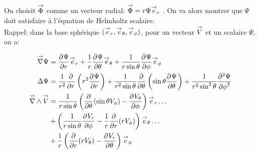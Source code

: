 On choisit \(\vect \Phi\) comme un vecteur radial: \(\vect \Phi = r \Psi \vect e_r\) \cite[p.~84]{bohren_absorption_2004}. On va alors montrer que \(\Psi\) doit satisfaire à l'équation de Helmholtz scalaire.\\

Rappel: dans la base sphérique \((\vect e_r, \vect e_\theta, \vect e_\phi)\), pour
un vecteur \(\vect V\)
et un scalaire \(\Psi\), on a:

\begin{align*}
\vgrad \Psi &= \ddr{r}{\Psi} \vect e_r + \frac{1}{r}\ddr{\theta}{\Psi}\vect e_\theta + \frac{1}{r\sin\theta}\ddr{\phi}{\Psi} \vect e_\phi\\
 \Delta \Psi & = \frac{1}{r^2}\ddr{r}{}\left(r^2\ddr{r}{\Psi}\right)
+ \frac{1}{r^2\sin\theta}\ddr{\theta}{}\left(\sin\theta\ddr{\theta}{\Psi}\right)
+ \frac{1}{r^2\sin^2\theta}\ddr[2]{\phi}{\Psi} \\
\vrot \vect V &= \frac{1}{r\sin\theta}\left(\ddr{\theta}{}(\sin\theta V_\phi)-\ddr{\phi}{V_\theta}\right)\vect e_r \dots\\
&+ \left(\frac{1}{r\sin\theta}\ddr{\phi}{V_r} - \frac{1}{r}\ddr{r}{}(rV_\phi)\right) \vect e_\theta \dots \\
&+ \frac{1}{r}\left( \ddr{r}{}(rV_\theta) - \ddr{\theta}{V_r}\right)\vect e_\phi
\end{align*}



